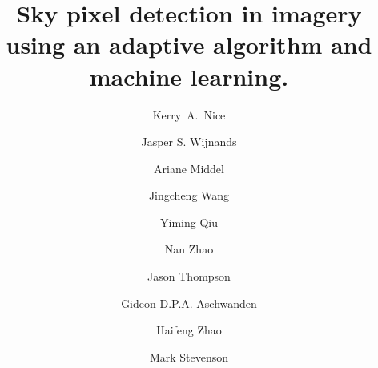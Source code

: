 \documentclass[final,3p,times,authoryear]{elsarticle}
\begin{document}
% 


\begin{frontmatter}



\title{Sky pixel detection in imagery using an adaptive algorithm and machine learning.}




\author[melb]{Kerry~A.~Nice}
\author[melb]{Jasper S. Wijnands}
\author[asu]{Ariane Middel}
\author[cis]{Jingcheng Wang}
\author[cis]{Yiming Qiu}
\author[cis]{Nan Zhao}
\author[melb,sunshine]{Jason Thompson}
\author[melb]{Gideon D.P.A. Aschwanden}
\author[melb]{Haifeng Zhao}
\author[melb,eng]{Mark Stevenson}

\address[melb]{Transport, Health, and Urban Design Hub, Faculty of Architecture, Building, and Planning, University of Melbourne, Victoria 3010, Australia}
\address[cis]{School of Computing and Information Systems, University of Melbourne, Victoria 3010, Australia}
\address[eng]{Melbourne School of Engineering; and Melbourne School of Population and Global Health, University of Melbourne, Victoria, Australia.}
\address[sunshine]{Centre for Human Factors and Sociotechnical Systems, University of the Sunshine Coast, Australia.}
\address[asu]{School of Computing, Informatics, and Decision Systems Engineering (CIDSE), Arizona State University}






\end{frontmatter}
\end{document}
